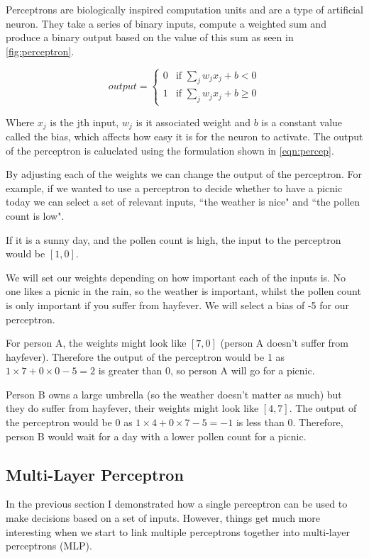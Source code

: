 Perceptrons are biologically inspired computation units and are a type of artificial neuron. They take a series of binary inputs, compute a weighted sum and produce a binary output based on the value of this sum as seen in \autoref{fig:perceptron}.


\begin{equation}
output = \begin{cases}
0 &\text{if $\sum_{j} w_j x_j + b < 0$}\\
1 &\text{if $\sum_{j} w_j x_j + b \geq 0$}
\end{cases}
\label{eqn:percep} 
\end{equation}

Where $x_j$ is the jth input, $w_j$ is it associated weight and $b$ is a constant value called the bias, which affects how easy it is for the neuron to activate. The output of the perceptron is caluclated using the formulation shown in \autoref{eqn:percep}.

By adjusting each of the weights we can change the output of the perceptron. For example, if we wanted to use a perceptron to decide whether to have a picnic today we can  select a set of relevant inputs, ``the weather is nice" and ``the pollen count is low".

If it is a sunny day, and the pollen count is high, the input to the perceptron would be $[1,0]$.
 
We will set our weights depending on how important each of the inputs is. No one likes a picnic in the rain, so the weather is important, whilst the pollen count is only important if you suffer from hayfever. We will select a bias of -5 for our perceptron.

For person A, the weights might look like $[7, 0]$ (person A doesn't suffer from hayfever). Therefore the output of the perceptron would be 1 as $1 \times 7 + 0 \times 0 - 5 = 2$ is greater than 0, so person A will go for a picnic.

Person B owns a large umbrella (so the weather doesn't matter as much) but they do suffer from hayfever, their weights might look like $[4, 7]$. The output of the perceptron would be 0 as  $1 \times 4 + 0 \times 7 - 5 = -1$ is less than 0. Therefore, person B would wait for a day with a lower pollen count for a picnic.


\subsection{Multi-Layer Perceptron}
In the previous section I demonstrated how a single perceptron can be used to make decisions based on a set of inputs. However, things get much more interesting when we start to link multiple perceptrons together into multi-layer perceptrons (MLP).

